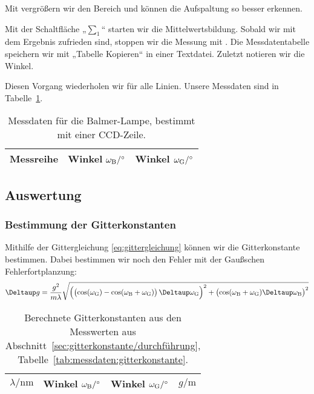 Mit \Alt{} vergrößern wir den Bereich und können die Aufspaltung so
besser erkennen.

Mit der Schaltfläche „$\sum_1$“ starten wir die Mittelwertsbildung. Sobald wir
mit dem Ergebnis zufrieden sind, stoppen wir die Messung mit .
Die Messdatentabelle speichern wir mit „Tabelle Kopieren“ in einer Textdatei.
Zuletzt notieren wir die Winkel.

Diesen Vorgang wiederholen wir für alle Linien. Unsere Messdaten sind in
Tabelle~\ref{tab:messdaten:balmer-ccd}.

\begin{table}[htbp]
    \centering
    \begin{tabular}{SSS}
        {Messreihe} & {Winkel $\omegaB / \si\degree$}  & {Winkel $\omegaG /
    \si\degree$} \\
        \hline
    \end{tabular}
    \caption{%
        Messdaten für die Balmer-Lampe, bestimmt mit einer CCD-Zeile.
    }
    \label{tab:messdaten:balmer-ccd}
\end{table}

\FloatBarrier
\subsection{Auswertung}

\FloatBarrier
\subsubsection{Bestimmung der Gitterkonstanten}

Mithilfe der Gittergleichung \eqref{eq:gittergleichung} können wir die
Gitterkonstante bestimmen. Dabei bestimmen wir noch den Fehler mit der
Gaußschen Fehlerfortplanzung:
\[
    \Deltaup g
    = \frac{g^2}{m\lambda} \sqrt{
        \del{\del{\cos(\omegaG) - \cos(\omegaB +
        \omegaG)} \Deltaup \omegaG}^2
        +
        \del{\cos(\omegaB + \omegaG) \Deltaup \omegaB}^2
    }
\]

\begin{table}[htbp]
    \centering
    \begin{tabular}{SSS|S}
        {$\lambda / \si{\nano\meter}$} & {Winkel $\omegaB / \si\degree$}  & {Winkel
    $\omegaG / \si\degree$} & {$g / \si{\meter}$} \\
        \hline
    \end{tabular}
    \caption{%
        Berechnete Gitterkonstanten aus den Messwerten aus
        Abschnitt~\ref{sec:gitterkonstante/durchführung},
        Tabelle~\ref{tab:messdaten:gitterkonstante}.
    }
    \label{tab:gitterkonstanten}
\end{table}

